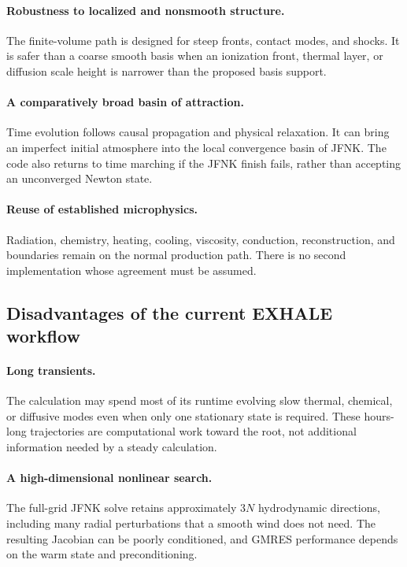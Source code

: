 \documentclass[english,a4paper]{my_memo}
\begin{document}
\paragraph{Robustness to localized and nonsmooth structure.}
The finite-volume path is designed for steep fronts, contact modes, and shocks.
It is safer than a coarse smooth basis when an ionization front, thermal layer,
or diffusion scale height is narrower than the proposed basis support.

\paragraph{A comparatively broad basin of attraction.}
Time evolution follows causal propagation and physical relaxation.  It can
bring an imperfect initial atmosphere into the local convergence basin of JFNK.
The code also returns to time marching if the JFNK finish fails, rather than
accepting an unconverged Newton state.

\paragraph{Reuse of established microphysics.}
Radiation, chemistry, heating, cooling, viscosity, conduction, reconstruction,
and boundaries remain on the normal production path.  There is no second
implementation whose agreement must be assumed.

\subsection{Disadvantages of the current EXHALE workflow}

\paragraph{Long transients.}
The calculation may spend most of its runtime evolving slow thermal, chemical,
or diffusive modes even when only one stationary state is required.  These
hours-long trajectories are computational work toward the root, not additional
information needed by a steady calculation.

\paragraph{A high-dimensional nonlinear search.}
The full-grid JFNK solve retains approximately \(3N\) hydrodynamic directions,
including many radial perturbations that a smooth wind does not need.  The
resulting Jacobian can be poorly conditioned, and GMRES performance depends on
the warm state and preconditioning.
\end{document}
